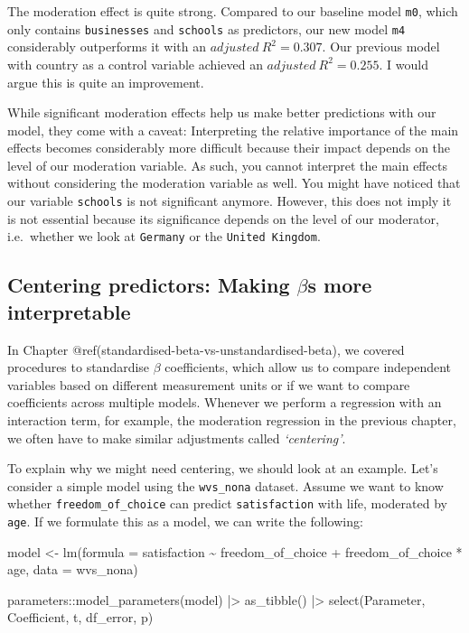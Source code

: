 \documentclass[
  letterpaper,
]{krantz}
\makeatletter
\newenvironment{Shaded}{\begin{snugshade}}{\end{snugshade}}
\newcommand{\AttributeTok}[1]{\textcolor[rgb]{0.40,0.45,0.13}{#1}}
\newcommand{\FunctionTok}[1]{\textcolor[rgb]{0.28,0.35,0.67}{#1}}
\newcommand{\NormalTok}[1]{\textcolor[rgb]{0.00,0.23,0.31}{#1}}
\newcommand{\OtherTok}[1]{\textcolor[rgb]{0.00,0.23,0.31}{#1}}
\newcommand{\SpecialCharTok}[1]{\textcolor[rgb]{0.37,0.37,0.37}{#1}}
\newenvironment{kframe}{%
\medskip{}
\setlength{\fboxsep}{.8em}
 \def\at@end@of@kframe{}%
 \ifinner\ifhmode%
  \def\at@end@of@kframe{\end{minipage}}%
  \begin{minipage}{\columnwidth}%
 \fi\fi%
 \def\FrameCommand##1{\hskip\@totalleftmargin \hskip-\fboxsep
 \colorbox{shadecolor}{##1}\hskip-\fboxsep
     \hskip-\linewidth \hskip-\@totalleftmargin \hskip\columnwidth}%
 \MakeFramed {\advance\hsize-\width
   \@totalleftmargin\z@ \linewidth\hsize
   \@setminipage}}%
 {\par\unskip\endMakeFramed%
 \at@end@of@kframe}
\renewenvironment{Shaded}{\begin{kframe}}{\end{kframe}}
\makeatother
\begin{document}
The moderation effect is quite strong. Compared to our baseline model
\texttt{m0}, which only contains \texttt{businesses} and
\texttt{schools} as predictors, our new model \texttt{m4} considerably
outperforms it with an \(adjusted\ R^2 = 0.307\). Our previous model
with country as a control variable achieved an
\(adjusted\ R^2 = 0.255\). I would argue this is quite an improvement.

While significant moderation effects help us make better predictions
with our model, they come with a caveat: Interpreting the relative
importance of the main effects becomes considerably more difficult
because their impact depends on the level of our moderation variable. As
such, you cannot interpret the main effects without considering the
moderation variable as well. You might have noticed that our variable
\texttt{schools} is not significant anymore. However, this does not
imply it is not essential because its significance depends on the level
of our moderator, i.e.~whether we look at \texttt{Germany} or the
\texttt{United\ Kingdom}.

\subsection{\texorpdfstring{Centering predictors: Making \(\beta\)s more
interpretable}{Centering predictors: Making \textbackslash betas more interpretable}}\label{sec-centering-predictors}

In Chapter @ref(standardised-beta-vs-unstandardised-beta), we covered
procedures to standardise \(\beta\) coefficients, which allow us to
compare independent variables based on different measurement units or if
we want to compare coefficients across multiple models. Whenever we
perform a regression with an interaction term, for example, the
moderation regression in the previous chapter, we often have to make
similar adjustments called \emph{`centering'}.

To explain why we might need centering, we should look at an example.
Let's consider a simple model using the \texttt{wvs\_nona} dataset.
Assume we want to know whether \texttt{freedom\_of\_choice} can predict
\texttt{satisfaction} with life, moderated by \texttt{age}. If we
formulate this as a model, we can write the following:

\begin{Shaded}
\begin{Highlighting}[]
\NormalTok{model }\OtherTok{\textless{}{-}} \FunctionTok{lm}\NormalTok{(}\AttributeTok{formula =}\NormalTok{ satisfaction }\SpecialCharTok{\textasciitilde{}}
\NormalTok{              freedom\_of\_choice }\SpecialCharTok{+}
\NormalTok{              freedom\_of\_choice }\SpecialCharTok{*}\NormalTok{ age,}
            \AttributeTok{data =}\NormalTok{ wvs\_nona)}

\NormalTok{parameters}\SpecialCharTok{::}\FunctionTok{model\_parameters}\NormalTok{(model) }\SpecialCharTok{|\textgreater{}}
  \FunctionTok{as\_tibble}\NormalTok{() }\SpecialCharTok{|\textgreater{}}
  \FunctionTok{select}\NormalTok{(Parameter, Coefficient, t, df\_error, p)}
\end{Highlighting}
\end{Shaded}
\end{document}
